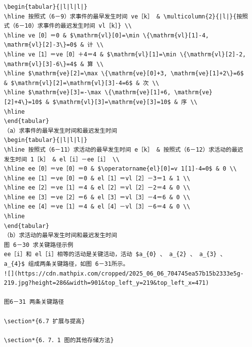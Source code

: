 \documentclass[10pt]{article}
\begin{document}
\begin{verbatim}
\begin{tabular}{|l|l|l|}
\hline 按照式（6－9）求事件的最早发生时间 ve［k］ & \multicolumn{2}{|l|}{按照式（6－10）求事件的最迟发生时间 vl［k］} \\
\hline ve［0］＝0 & $\mathrm{vl}[0]=\min \{\mathrm{vl}[1]-4, \mathrm{vl}[2]-3\}=0$ & 计 \\
\hline ve［1］＝ve［0］＋4＝4 & $\mathrm{vl}[1]=\min \{\mathrm{vl}[2]-2, \mathrm{vl}[3]-6\}=4$ & 算 \\
\hline $\mathrm{ve}[2]=\max \{\mathrm{ve}[0]+3, \mathrm{ve}[1]+2\}=6$ & $\mathrm{vl}[2]=\mathrm{vl}[3]-4=6$ & 次 \\
\hline $\mathrm{ve}[3]=-\max \{\mathrm{ve}[1]+6, \mathrm{ve}[2]+4\}=10$ & $\mathrm{vl}[3]=\mathrm{ve}[3]=10$ & 序 \\
\hline
\end{tabular}
（a）求事件的最早发生时间和最迟发生时间
\begin{tabular}{|l|l|l|}
\hline 按照式（6－11）求活动的最早发生时间 e［k］ & 按照式（6－12）求活动的最迟发生时间 1［k］ & el［i］－ee［i］ \\
\hline ee［0］＝ve［0］＝0 & $\operatorname{el}[0]=v 1[1]-4=0$ & 0 \\
\hline ee［1］＝ve［0］＝0 & el［1］＝vl［2］－3＝1 & 1 \\
\hline ee［2］＝ve［1］＝4 & el［2］＝vl［2］－2＝4 & 0 \\
\hline ee［3］＝ve［2］＝6 & el［3］＝vl［3］－4＝6 & 0 \\
\hline ee［4］＝ve［1］＝4 & el［4］－vl［3］－6＝4 & 0 \\
\hline
\end{tabular}
（b）求活动的最早发生时间和最迟发生时间
图 6－30 求关键路径示例
ee［i］和 el［i］相等的活动是关键活动，活动 $a_{0} 、 a_{2} 、 a_{3} 、 a_{4}$ 组成两条关键路径，如图 6－31所示。
![](https://cdn.mathpix.com/cropped/2025_06_06_704745ea57b15b2333e5g-219.jpg?height=286&width=901&top_left_y=219&top_left_x=471)

图6－31 两条关键路径

\section*{6.7 扩展与提高}

\section*{6．7．1 图的其他存储方法}


\end{verbatim}
\end{document}
